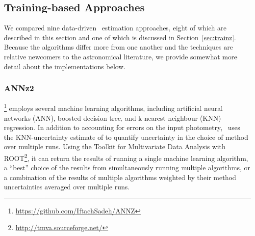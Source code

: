 \subsection{Training-based Approaches}
\label{sec:trainingcodes}

We compared nine data-driven \pz\ estimation approaches, eight of which are described in this section and one of which is discussed in Section~\ref{sec:trainz}.
Because the algorithms differ more from one another and the techniques are relative newcomers to the astronomical literature, we provide somewhat more detail about the implementations below.


\subsubsection{ANNz2}
\label{sec:annz2}

\annz \footnote{\url{https://github.com/IftachSadeh/ANNZ}} \citep{Sadeh:16} employs several machine learning algorithms, including artificial neural networks (ANN), boosted decision tree, and k-nearest neighbour (KNN) regression.
In addition to accounting for errors on the input photometry, \annz\ uses the KNN-uncertainty estimate of \citet{Oyaizu:08} to quantify uncertainty in the choice of method over multiple runs.
Using the Toolkit for Multivariate Data Analysis with ROOT\footnote{\url{http://tmva.sourceforge.net/}}, it can return the results of running a single machine learning algorithm, a ``best'' choice of the results from simultaneously running multiple algorithms, or a combination of the results of multiple algorithms weighted by their method uncertainties averaged over multiple runs.


